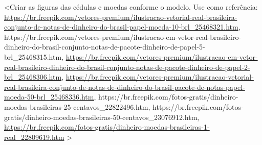 \textless{}Criar as figuras das cédulas e moedas conforme o modelo. Use
como referência:
\url{https://br.freepik.com/vetores-premium/ilustracao-vetorial-real-brasileira-conjunto-de-notas-de-dinheiro-do-brasil-papel-moeda-10-brl_25468321.htm},
https://br.freepik.com/vetores-premium/ilustracao-em-vetor-real-brasileiro-dinheiro-do-brasil-conjunto-notas-de-pacote-dinheiro-de-papel-5-brl\_25468315.htm,
\url{https://br.freepik.com/vetores-premium/ilustracao-em-vetor-real-brasileiro-dinheiro-do-brasil-conjunto-notas-de-pacote-dinheiro-de-papel-2-brl_25468306.htm},
\url{https://br.freepik.com/vetores-premium/ilustracao-vetorial-real-brasileira-conjunto-de-notas-de-dinheiro-do-brasil-pacote-de-notas-papel-moeda-50-brl_25468336.htm,}
https://br.freepik.com/fotos-gratis/dinheiro-moedas-brasileiras-25-centavos\_22822496.htm,
https://br.freepik.com/fotos-gratis/dinheiro-moedas-brasileiras-50-centavos\_23076912.htm,
\url{https://br.freepik.com/fotos-gratis/dinheiro-moedas-brasileiras-1-real_22809619.htm}
\textgreater{}

